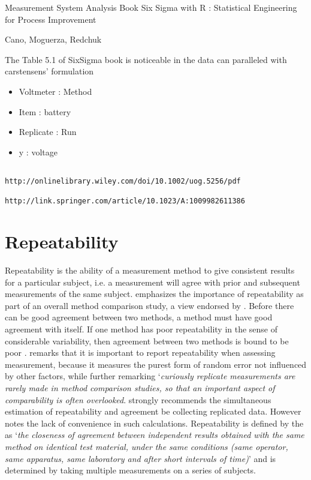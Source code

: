 \documentclass[MAIN.tex]{subfiles}
\begin{document}

Measurement System Analysis 
Book Six Sigma with R : Statistical Engineering for Process Improvement

Cano, Moguerza, Redchuk


The Table 5.1 of SixSigma book is noticeable in the data can paralleled with carstensens' formulation

\begin{itemize}
	\item Voltmeter : Method 
	\item Item : battery
	\item Replicate : Run
	\item y : voltage
\end{itemize}



	\begin{verbatim}

http://onlinelibrary.wiley.com/doi/10.1002/uog.5256/pdf

http://link.springer.com/article/10.1023/A:1009982611386	
	\end{verbatim}

	

\bigskip

\section{Repeatability}

Repeatability is the ability of a measurement method to give consistent results for a particular subject, i.e. a measurement will agree with prior and subsequent measurements of the same subject. \citet{Barnhart} emphasizes the importance of repeatability as part of an overall method comparison study, a view endorsed by \citet{BXC2008}. Before there can be good agreement between two methods, a method must have good agreement with itself. If one method has poor repeatability in the sense of considerable
variability, then agreement between two methods is bound to be
poor \citep{ARoy2009}. \citet{Barnhart} remarks that it is important to report repeatability when assessing
measurement, because it measures the purest form of random error
not influenced by other factors, while further remarking `\textit{curiously replicate measurements are rarely made in method comparison studies, so that an important aspect of comparability is often overlooked}. \citet{BA99} strongly recommends the simultaneous estimation of repeatability and agreement be collecting replicated data.
However \citet{ARoy2009} notes the lack of convenience in such calculations. 	Repeatability is defined by the \citet{IUPAC} as `\textit{the closeness of agreement between independent results obtained with the same method on identical test material, under the same conditions (same
	operator, same apparatus, same laboratory and after short intervals of time)}'  and is determined by taking multiple measurements on a series of subjects.
\end{document}
